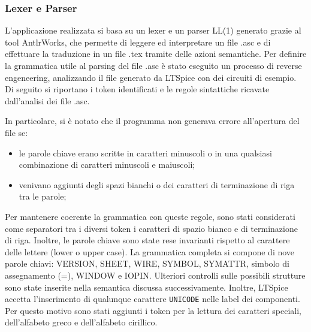 \subsubsection{Lexer e Parser}
L'applicazione realizzata si basa su un lexer e un parser LL(1) generato grazie al tool AntlrWorks, che permette di leggere ed interpretare un file .asc e di effettuare la traduzione in un file .tex tramite delle azioni semantiche. Per definire la grammatica utile al parsing del file .asc è stato eseguito un processo di reverse engeneering, analizzando il file generato da LTSpice con dei circuiti di esempio. Di seguito si riportano i token identificati e le regole sintattiche ricavate dall'analisi dei file .asc.

In particolare, si è notato che il programma non generava errore all'apertura del file se:
\begin{itemize}
	\item le parole chiave erano scritte in caratteri minuscoli o in una qualsiasi combinazione di caratteri minuscoli e maiuscoli;
	\item venivano aggiunti degli spazi bianchi o dei caratteri di terminazione di riga tra le parole;
\end{itemize}
Per mantenere coerente la grammatica con queste regole, sono stati considerati come separatori tra i diversi token i caratteri di spazio bianco e di terminazione di riga. Inoltre, le parole chiave sono state rese invarianti rispetto al carattere delle lettere (lower o upper case). La grammatica completa si compone di nove parole chiavi: VERSION, SHEET, WIRE, SYMBOL, SYMATTR, simbolo di assegnamento (=), WINDOW e IOPIN. Ulteriori controlli sulle possibili strutture sono state inserite nella semantica discussa successivamente. Inoltre, LTSpice accetta l'inserimento di qualunque carattere \texttt{UNICODE} nelle label dei componenti. Per questo motivo sono stati aggiunti i token per la lettura dei caratteri speciali, dell'alfabeto greco e dell'alfabeto cirillico.




